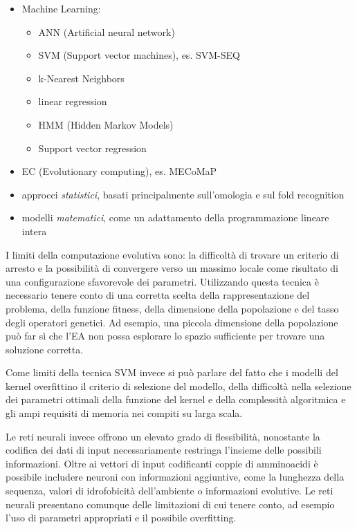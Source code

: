 \begin{itemize}
	\item Machine Learning:
	\begin{itemize}
		\item ANN (Artificial neural network)
		\item SVM (Support vector machines), es. SVM-SEQ 
		\item k-Nearest Neighbors
		\item linear regression
		\item HMM (Hidden Markov Models)
		\item Support vector regression
	\end{itemize}
	
	\item EC (Evolutionary computing), es. MECoMaP
	\item approcci \textit{statistici}, basati principalmente sull'omologia e sul fold recognition
	\item modelli \textit{matematici}, come un adattamento della programmazione lineare intera
\end{itemize}

I limiti della computazione evolutiva sono: la difficoltà di trovare un criterio di arresto e la possibilità di convergere verso un massimo locale come risultato di una configurazione sfavorevole dei parametri. Utilizzando questa tecnica è necessario tenere conto di una corretta scelta della rappresentazione del problema, della funzione fitness, della dimensione della popolazione e del tasso degli operatori genetici. Ad esempio, una piccola dimensione della popolazione può far sì che l'EA non possa esplorare lo spazio sufficiente per trovare una soluzione corretta.

\par Come limiti della tecnica SVM invece si può parlare del fatto che i modelli del kernel overfittino il criterio di selezione del modello, della difficoltà nella selezione dei parametri ottimali della funzione del kernel e della complessità algoritmica e gli ampi requisiti di memoria nei compiti su larga scala.

\par Le reti neurali invece offrono un elevato grado di flessibilità, nonostante la codifica dei dati di input necessariamente restringa l'insieme delle possibili informazioni. Oltre ai vettori di input codificanti coppie di amminoacidi è possibile includere neuroni con informazioni aggiuntive, come la lunghezza della sequenza, valori di idrofobicità dell'ambiente o informazioni evolutive. Le reti neurali presentano comunque delle limitazioni di cui tenere conto, ad esempio l'uso di parametri appropriati e il possibile overfitting.

